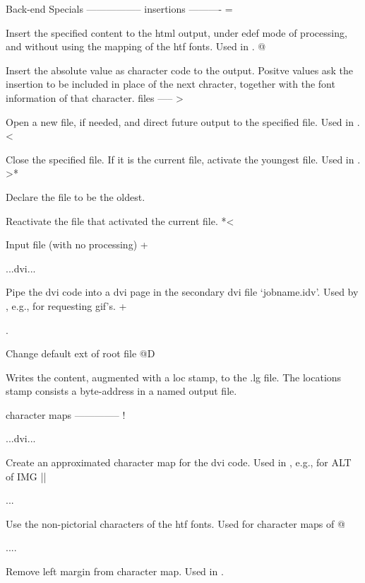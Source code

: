 {Back-end Specials
-----------------
                                                    insertions
                                                    ----------
  =    
           Insert the specified content to the html output, under 
           edef mode of processing, and without using the mapping
           of the htf fonts.  Used in .
  @    
           Insert the absolute value as character code to the output.
           Positve values ask the insertion to be included in place
           of the next chracter, together with the font information
           of that character.
                                                    files
                                                    -----
  >    
           Open a new file, if needed, and direct future output
           to the specified file.  Used in .
  <    
           Close the specified file.  If it is the current file,
           activate the youngest file. Used in .
  >*   
           Declare the file to be the oldest.
           Reactivate the file that activated the current file.
  *<   
           Input file (with no processing)
  +    ...dvi...
           Pipe the dvi code into a dvi page in the secondary dvi file
           `jobname.idv'.  Used by , e.g., for requesting 
           gif's.
  +    
  .    
           Change default ext of root file
  @D    Writes the content, augmented with a
           loc stamp, to the .lg file.  The locations stamp consists
           a byte-address in a named output file.

                                                    character maps
                                                    --------------
  !    ...dvi...
           Create an approximated character map for the dvi code.
           Used in , e.g., for ALT of IMG
  ||    ...
           Use the non-pictorial characters of the htf fonts.
           Used for character maps of 
  @    ....
           Remove left margin from character map.  Used in .

}
